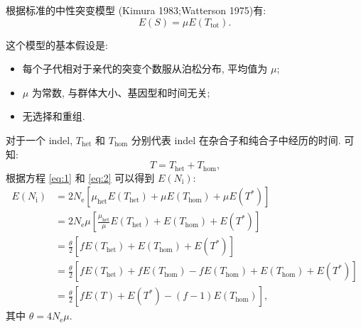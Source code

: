 \documentclass[12pt]{article}
\begin{document}
根据标准的中性突变模型 (Kimura 1983;Watterson 1975)有:
\begin{equation} \label{eq:1}
    E(S) = \mu E(T_{\text{tot}})
    \text{.}
\end{equation}

这个模型的基本假设是:
\begin{itemize}[leftmargin=4em]
    \item 每个子代相对于亲代的突变个数服从泊松分布, 平均值为 $\mu$;
    \item $\mu$ 为常数, 与群体大小、基因型和时间无关;
    \item 无选择和重组.
\end{itemize}

对于一个 indel, $T_\text{het}$ 和 $T_\text{hom}$ 分别代表 indel 在杂合子和纯合子中经历的时间. 可知:
\begin{equation} \label{eq:2}
    T = T_\text{het} + T_\text{hom}
    \text{,}
\end{equation}
根据方程 \ref{eq:1} 和 \ref{eq:2} 可以得到 $E(N_\text{i})$:
\begin{equation} \label{eq:3}
    \begin{split}
        E(N_\text{i})
        &= 2 N_\text{e} [\mu_\text{het}E(T_{\text{het}}) + \mu E(T_{\text{hom}}) + \mu E(T^*)] \\
        &= 2 N_\text{e}\mu [\frac{\mu_\text{het}}{\mu} E(T_{\text{het}}) + E(T_{\text{hom}}) + E(T^*)] \\
        &= \frac{\theta}{2} [f E(T_{\text{het}}) + E(T_{\text{hom}}) + E(T^*)] \\
        &= \frac{\theta}{2} [f E(T_{\text{het}}) + f E(T_{\text{hom}}) - f E(T_{\text{hom}}) + E(T_{\text{hom}}) + E(T^*)] \\
        &= \frac{\theta}{2} [f E(T) + E(T^*) - (f - 1) E(T_{\text{hom}})]
        \text{,}
    \end{split}
\end{equation}
其中 $\theta = 4N_\text{e}\mu$.
\end{document}
